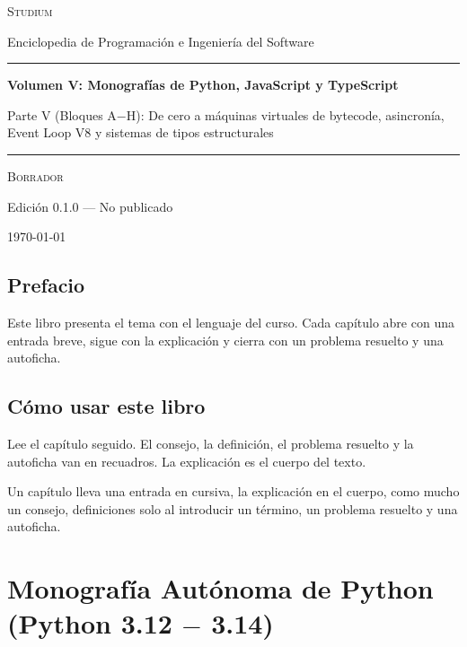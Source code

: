 \documentclass{book}
\begin{document}
\frontmatter
\thispagestyle{empty}
\setlength{\parindent}{0pt}
\vspace*{0.08\textheight}
{\normalsize\scshape\color{studiumInk} Studium\par}
{\small Enciclopedia de Programación e Ingeniería del Software\par}
\vspace{0.55em}
{\color{studiumRule}\rule{\linewidth}{0.9pt}\par}
\vspace{0.16\textheight}
{\raggedright\Huge\bfseries Volumen V: Monografías de Python, JavaScript y TypeScript\par}
\vspace{0.9em}
{\raggedright\Large\color{studiumInk} Parte V (Bloques A\(-\)H): De cero a máquinas virtuales de bytecode, asincronía, Event Loop V8 y sistemas de tipos estructurales\par}
\vfill
{\color{studiumRule}\rule{0.36\linewidth}{0.45pt}\par}
\vspace{1.05em}
{\large\scshape Borrador\par}
\vspace{0.45em}
{\normalsize Edición 0.1.0 --- No publicado\par}
\vspace{0.4em}
{\normalsize\today\par}
\vspace*{0.08\textheight}
\clearpage
\chapter{Prefacio}
\noindent Este libro presenta el tema con el lenguaje del curso. Cada capítulo abre con una entrada breve, sigue con la explicación y cierra con un problema resuelto y una autoficha.
\chapter{Cómo usar este libro}
\noindent Lee el capítulo seguido. El consejo, la definición, el problema resuelto y la autoficha van en recuadros. La explicación es el cuerpo del texto.

\noindent Un capítulo lleva una entrada en cursiva, la explicación en el cuerpo, como mucho un consejo, definiciones solo al introducir un término, un problema resuelto y una autoficha.
\tableofcontents
\mainmatter

\part{Monografía Autónoma de Python (Python 3.12 \(-\) 3.14)}
\end{document}
